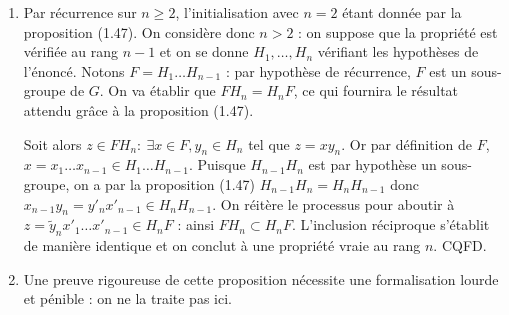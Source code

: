\begin{enumerate}
 \item Par récurrence sur $n\geqslant 2$, l'initialisation avec $n=2$ étant donnée par la proposition (1.47). On considère donc $n>2$ : on suppose que la propriété est vérifiée au rang $n-1$ et on se donne $H_1,\ldots, H_n$ vérifiant les hypothèses de l'énoncé. Notons $F = H_1\ldots H_{n-1}$ : par hypothèse de récurrence, $F$ est un sous-groupe de $G$. On va établir que $FH_n = H_nF$, ce qui fournira le résultat attendu grâce à la proposition (1.47).

  Soit alors $z\in FH_n :~ \exists x\in F, y_n\in H_n$ tel que $z= xy_n$. Or par définition de $F$, $x = x_1\ldots x_{n-1} \in H_1\ldots H_{n-1}$. Puisque $H_{n-1}H_n$ est par hypothèse un sous-groupe, on a par la proposition (1.47) $H_{n-1}H_n = H_nH_{n-1}$ donc $x_{n-1} y_n = y'_n x'_{n-1} \in H_nH_{n-1}$. On réitère le processus pour aboutir à $z = \tilde{y}_n x'_1\ldots x'_{n-1} \in H_n F$ : ainsi $FH_n \subset H_n F$. L'inclusion réciproque s'établit de manière identique et on conclut à une propriété vraie au rang $n$. CQFD.

\item Une preuve rigoureuse de cette proposition nécessite une formalisation lourde et pénible : on ne la traite pas ici.
\end{enumerate}

